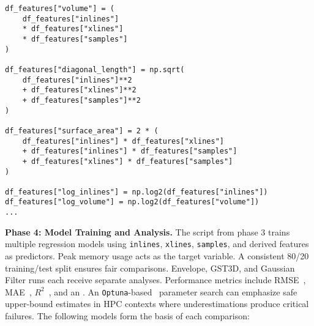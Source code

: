 \begin{lstlisting}[style=pythonstyle,
    caption={Feature extraction excerpt from \texttt{collect\_results.py}~\cite{delucca2025experiment2resultscollection}. Additional derived metrics capture polynomial or ratio-based growth.},
    label={lst:results_py}]
df_features["volume"] = (
    df_features["inlines"]
    * df_features["xlines"]
    * df_features["samples"]
)

df_features["diagonal_length"] = np.sqrt(
    df_features["inlines"]**2
    + df_features["xlines"]**2
    + df_features["samples"]**2
)

df_features["surface_area"] = 2 * (
    df_features["inlines"] * df_features["xlines"]
    + df_features["inlines"] * df_features["samples"]
    + df_features["xlines"] * df_features["samples"]
)

df_features["log_inlines"] = np.log2(df_features["inlines"])
df_features["log_volume"] = np.log2(df_features["volume"])
...
\end{lstlisting}

\vspace{1em}
\noindent
\textbf{Phase 4: Model Training and Analysis.}
The script from phase 3 trains multiple regression models using \texttt{inlines}, \texttt{xlines}, \texttt{samples}, and derived features as predictors.
Peak memory usage acts as the target variable.
A consistent 80/20 training/test split ensures fair comparisons.
Envelope, \ac{GST3D}, and Gaussian Filter runs each receive separate analyses.
Performance metrics include \ac{RMSE}~\cite{hyndman2006}, \ac{MAE}~\cite{willmott2005mae}, $R^2$~\cite{draper1998applied}, and an .
An \texttt{Optuna}-based~\cite{akiba2019optuna} parameter search can emphasize safe upper-bound estimates in \ac{HPC} contexts where underestimations produce critical failures.
The following models form the basis of each comparison:

